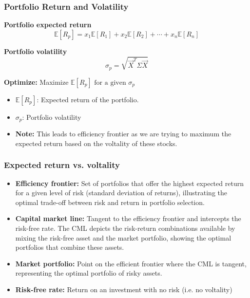     \subsubsection{Portfolio Return and Volatility}
    \begin{intuition}
        \textbf{Portfolio expected return}
        \[
        \mathbb{E} \left[ R_p \right] = x_1 \mathbb{E} \left[ R_1 \right] + x_2 \mathbb{E} \left[ R_2 \right] + \cdots + x_n \mathbb{E} \left[ R_n \right]
        \]
        \vspace{1em}

        \textbf{Portfolio volatility}
        \[
        \sigma_p = \sqrt{\vec{X}^T \Sigma \vec{X}}
        \]
        \vspace{1em}

        \textbf{Optimize:} Maximize \(\mathbb{E} \left[ R_p \right] \text{ for a given } \sigma_p \)
        \begin{itemize}
            \item $\mathbb{E} \left[ R_p \right]$: Expected return of the portfolio. 
            \item $\sigma_p$: Portfolio volatility
            \item \textbf{Note:} This leads to efficiency frontier as we are trying to maximum the expected return based on the voltality of these stocks. 
        \end{itemize}
    \end{intuition}

    \subsubsection{Expected return vs. voltality}
    \begin{intuition}
        \begin{itemize}
            \item \textbf{Efficiency frontier:} Set of portfolios that offer the highest expected return for a given level of risk (standard deviation of returns), illustrating the optimal trade-off between risk and return in portfolio selection.
            \item \textbf{Capital market line:} Tangent to the efficiency frontier and intercepts the risk-free rate.  The CML depicts the risk-return combinations available by mixing the risk-free asset and the market portfolio, showing the optimal portfolios that combine these assets.
            \item \textbf{Market portfolio:} Point on the efficient frontier where the CML is tangent, representing the optimal portfolio of risky assets.
            \item \textbf{Risk-free rate:} Return on an investment with no risk (i.e. no voltality)
        \end{itemize}
    \end{intuition}


